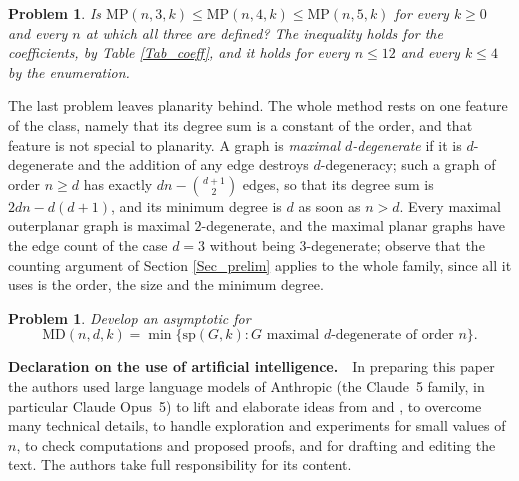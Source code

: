 \documentclass[10pt,a4paper]{article}
\newtheorem{problem}[theorem]{Problem}
\begin{document}
\begin{problem}
\label{Pr_monotone}
Is $\mathrm{MP}(n,3,k)\leq \mathrm{MP}(n,4,k)\leq \mathrm{MP}(n,5,k)$ for every $k\geq 0$ and every
$n$ at which all three are defined? The inequality holds for the coefficients, by Table
\ref{Tab_coeff}, and it holds for every $n\leq 12$ and every $k\leq 4$ by the enumeration.
\end{problem}

The last problem leaves planarity behind. The whole method rests on one feature of the class, namely
that its degree sum is a constant of the order, and that feature is not special to planarity. A graph is
\emph{maximal $d$-degenerate} if it is $d$-degenerate and the addition of any edge destroys
$d$-degeneracy; such a graph of order $n\geq d$ has exactly $dn-\binom{d+1}{2}$ edges, so that its degree
sum is $2dn-d(d+1)$, and its minimum degree is $d$ as soon as $n>d$. Every maximal outerplanar graph is
maximal $2$-degenerate, and the maximal planar graphs have the edge count of the case $d=3$
without being $3$-degenerate; observe that the counting argument of Section \ref{Sec_prelim} applies to the
whole family, since all it uses is the order, the size and the minimum degree.

\begin{problem}
\label{Pr_degenerate}Develop an asymptotic for
\[
\mathrm{MD}(n,d,k)=\min \{\mathrm{sp}(G,k):G\text{ maximal }d\text{-degenerate of order }n\} .
\]
\end{problem}


\bigskip\noindent\textbf{Declaration on the use of artificial intelligence.}~~In preparing this paper the
authors used large language models of Anthropic (the Claude~5 family, in particular Claude Opus~5) to lift
and elaborate ideas from \cite{CaroLauriZarb} and \cite{CaroWest}, to overcome many technical details, to
handle exploration and experiments for small values of $n$, to check computations and proposed proofs, and
for drafting and editing the text. The authors take full responsibility for its content.
\end{document}
